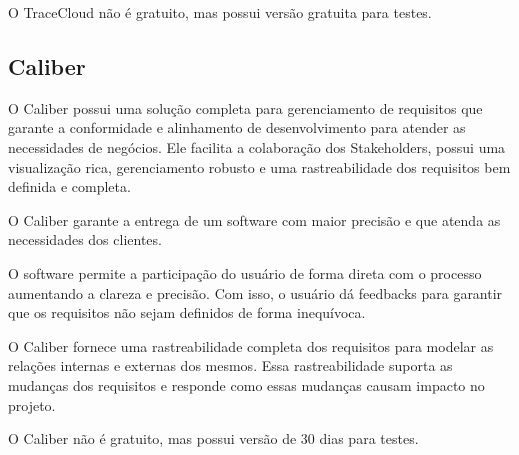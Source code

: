 O TraceCloud não é gratuito, mas possui versão gratuita para testes.

\subsection{Caliber}
O Caliber possui uma solução completa para gerenciamento de requisitos que garante a conformidade e alinhamento de desenvolvimento para atender as necessidades de negócios. Ele facilita a colaboração dos Stakeholders, possui uma visualização rica, gerenciamento robusto e uma rastreabilidade dos requisitos bem definida e completa.

O Caliber garante a entrega de um software com maior precisão e que atenda as necessidades dos clientes.

O software permite a participação do usuário de forma direta com o processo aumentando a clareza e precisão. Com isso, o usuário dá feedbacks para garantir que os requisitos não sejam definidos de forma inequívoca.

O Caliber fornece uma rastreabilidade completa dos requisitos para modelar as relações internas e externas dos mesmos.  Essa rastreabilidade suporta as mudanças dos requisitos  e responde como essas mudanças causam impacto no projeto.

O Caliber não é gratuito, mas possui versão de 30 dias para testes.
